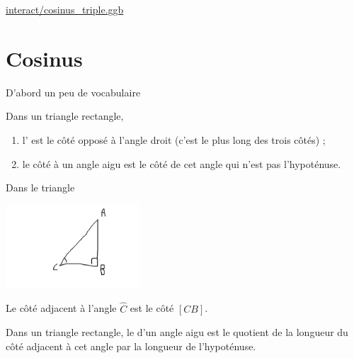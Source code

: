 


\url{interact/cosinus_triple.ggb}

\section{Cosinus}

D'abord un peu de vocabulaire

\begin{definition}
Dans un triangle rectangle,
\begin{enumerate}
    \item
        l' est le côté opposé à l'angle droit (c'est le plus long des trois côtés) ;
\item
    le côté  à un angle aigu est le côté de cet angle qui n'est pas l'hypoténuse.
\end{enumerate}
\end{definition}

\begin{example}
    Dans le triangle
    \begin{center}
        \includegraphics[width=5cm]{faux_ex_adj.pdf}
    \end{center}
    Le côté adjacent à l'angle \( \hat C\) est le côté \( [CB]\).
\end{example}

\begin{definition}
    Dans un triangle rectangle, le  d'un angle aigu est le quotient de la longueur du côté adjacent à cet angle par la longueur de l'hypoténuse.
\end{definition}

